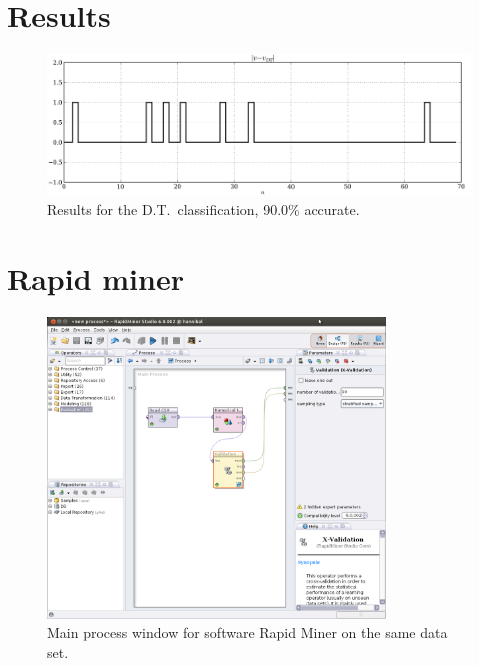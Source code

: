 \section*{Results}

\begin{figure}[H]
  \centering
		\includegraphics[width=1.0\textwidth]{images/DT_results.png}
  \caption{\scriptsize Results for the D.T.\ classification, 90.0\% accurate.}
\end{figure}

\section*{Rapid miner}

\begin{figure}[H]
  \centering
    \includegraphics[width=0.8\textwidth]{images/RM_main_process.png}
  \caption{\scriptsize Main process window for software Rapid Miner on the same data set.}
\end{figure}


